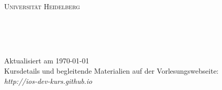 \begin{titlepage}

\begin{center}

\makeatletter

\textsc{
{\LARGE Universität Heidelberg}\\[0.4cm]
{\Large \semester}
}\\[6cm]

{\Huge \bfseries \@title}\\[1cm]
\textsc{\LARGE \@subtitle}



\vfill


\textsc{\Large \@author\\[1.5cm]}

\begin{minipage}{\textwidth}
\begin{flushleft} \large
{\large
Aktualisiert am \today\\
Kursdetails und begleitende Materialien auf der Vorlesungswebseite:\\
\emph{http://ios-dev-kurs.github.io}
}
\end{flushleft}
\end{minipage}


\makeatother

\end{center}

\end{titlepage}
